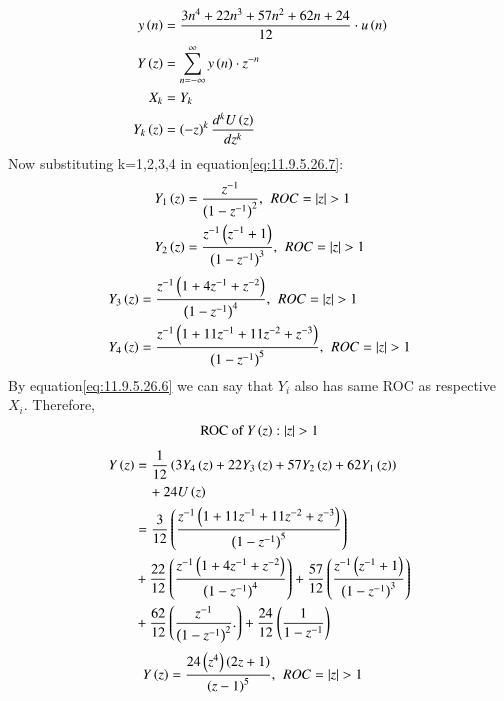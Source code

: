 \documentclass[journal,12pt,twocolumn]{IEEEtran}
\theoremstyle{remark}
\begin{document}
\begin{enumerate}[label=\arabic*.]
\begin{align}
    y\left(n\right) &=  \frac{3n^4 + 22n^3 + 57n^2 + 62n + 24}{12}\cdot u\left(n\right)\label{eq:11.9.5.26.5} \\
    Y\left(z\right) &= \sum_{n=-\infty}^\infty y\left(n\right)\cdot z^{-n}\\
    X_k&=Y_k\label{eq:11.9.5.26.6} \\
    Y_k\left(z\right) &=  \left(-z\right)^k \frac{d^kU\left(z\right)}{dz^k}\label{eq:11.9.5.26.7}
\end{align}
Now substituting k=1,2,3,4 in equation\eqref{eq:11.9.5.26.7}:
\begin{align}
    Y_1\brak{z} &= \frac{z^{-1}}{\brak{1-z^{-1}}^2} , \hspace{4pt} ROC=|z|>1\\
    Y_2\brak{z} &= \frac{z^{-1}\brak{z^{-1}+1}}{\brak{1-z^{-1}}^3} , \hspace{4pt} ROC=|z|>1
\end{align}
\begin{align}
    Y_3\brak{z} &= \frac{z^{-1}\brak{1+4z^{-1}+z^{-2}}}{\brak{1-z^{-1}}^4}, \hspace{4pt} ROC=|z|>1\\
    Y_4\brak{z} &= \frac{z^{-1}\brak{1+11z^{-1}+11z^{-2}+z^{-3}}}{\brak{1-z^{-1}}^5}, \hspace{4pt} ROC=|z|>1
\end{align}
By equation\eqref{eq:11.9.5.26.6} we can say that $Y_i$ also has same ROC as respective $X_i$. Therefore,
\begin{align}
    \text{ROC of $Y\brak{z}$} : |z|>1
\end{align}
\begin{align}
    Y\left(z\right) &=\frac{1}{12}\left(3Y_4\left(z\right) + 22Y_3\left(z\right) + 57Y_2\left(z\right) + 62Y_1\left(z\right)\right) \\
&\quad + 24U\left(z\right) \notag  \\
 &= \frac{3}{12}\left(\frac{z^{-1}\left(1+11z^{-1}+11z^{-2}+z^{-3}\right)}{\left(1-z^{-1}\right)^5}\right)\\ &+ \frac{22}{12}\left(\frac{z^{-1}\left(1+4z^{-1}+z^{-2}\right)}{\left(1-z^{-1}\right)^4}\right) 
         + \frac{57}{12}\left(\frac{z^{-1}\left(z^{-1}+1\right)}{\left(1-z^{-1}\right)^3}\right)\notag \\ &+ \frac{62}{12}\left(\frac{z^{-1}}{\left(1-z^{-1}\right)^2}.\right)+ \frac{24}{12}\left(\frac{1}{1 - z^{-1}} \right) \notag 
\end{align}
\begin{align}
        Y\brak{z} &= \frac{24 \brak{z^4} \brak{2z+1}}{\brak{z-1}^5} ,\hspace{4pt} ROC=|z|>1
\end{align}
\end{enumerate}
\end{document}
